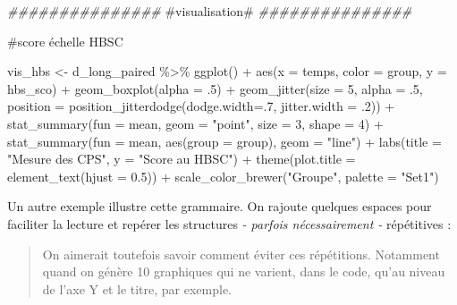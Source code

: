 \documentclass[
  letterpaper,
  DIV=11,
  numbers=noendperiod]{scrreprt}
\newenvironment{Shaded}{\begin{snugshade}}{\end{snugshade}}
\newcommand{\AttributeTok}[1]{\textcolor[rgb]{0.40,0.45,0.13}{#1}}
\newcommand{\CommentTok}[1]{\textcolor[rgb]{0.37,0.37,0.37}{#1}}
\newcommand{\DecValTok}[1]{\textcolor[rgb]{0.68,0.00,0.00}{#1}}
\newcommand{\DocumentationTok}[1]{\textcolor[rgb]{0.37,0.37,0.37}{\textit{#1}}}
\newcommand{\FloatTok}[1]{\textcolor[rgb]{0.68,0.00,0.00}{#1}}
\newcommand{\FunctionTok}[1]{\textcolor[rgb]{0.28,0.35,0.67}{#1}}
\newcommand{\NormalTok}[1]{\textcolor[rgb]{0.00,0.23,0.31}{#1}}
\newcommand{\OtherTok}[1]{\textcolor[rgb]{0.00,0.23,0.31}{#1}}
\newcommand{\SpecialCharTok}[1]{\textcolor[rgb]{0.37,0.37,0.37}{#1}}
\newcommand{\StringTok}[1]{\textcolor[rgb]{0.13,0.47,0.30}{#1}}
\begin{document}
\begin{Shaded}
\begin{Highlighting}[]
\DocumentationTok{\#\#\#\#\#\#\#\#\#\#\#\#\#\#\#}
\CommentTok{\#visualisation\#}
\DocumentationTok{\#\#\#\#\#\#\#\#\#\#\#\#\#\#\#}

\CommentTok{\#score échelle HBSC}

\NormalTok{vis\_hbs }\OtherTok{\textless{}{-}}\NormalTok{ d\_long\_paired }\SpecialCharTok{\%\textgreater{}\%} 
  \FunctionTok{ggplot}\NormalTok{() }\SpecialCharTok{+}
  \FunctionTok{aes}\NormalTok{(}\AttributeTok{x =}\NormalTok{ temps, }\AttributeTok{color =}\NormalTok{ group, }\AttributeTok{y =}\NormalTok{ hbs\_sco) }\SpecialCharTok{+}
  \FunctionTok{geom\_boxplot}\NormalTok{(}\AttributeTok{alpha =}\NormalTok{ .}\DecValTok{5}\NormalTok{) }\SpecialCharTok{+}
  \FunctionTok{geom\_jitter}\NormalTok{(}\AttributeTok{size =} \DecValTok{5}\NormalTok{, }\AttributeTok{alpha =}\NormalTok{ .}\DecValTok{5}\NormalTok{, }\AttributeTok{position =} \FunctionTok{position\_jitterdodge}\NormalTok{(}\AttributeTok{dodge.width=}\NormalTok{.}\DecValTok{7}\NormalTok{, }\AttributeTok{jitter.width =}\NormalTok{ .}\DecValTok{2}\NormalTok{)) }\SpecialCharTok{+}
  \FunctionTok{stat\_summary}\NormalTok{(}\AttributeTok{fun =}\NormalTok{ mean, }\AttributeTok{geom =} \StringTok{"point"}\NormalTok{, }\AttributeTok{size =} \DecValTok{3}\NormalTok{, }\AttributeTok{shape =} \DecValTok{4}\NormalTok{) }\SpecialCharTok{+}
  \FunctionTok{stat\_summary}\NormalTok{(}\AttributeTok{fun =}\NormalTok{ mean, }\FunctionTok{aes}\NormalTok{(}\AttributeTok{group =}\NormalTok{ group), }\AttributeTok{geom =} \StringTok{"line"}\NormalTok{) }\SpecialCharTok{+}
  \FunctionTok{labs}\NormalTok{(}\AttributeTok{title =} \StringTok{"Mesure des CPS"}\NormalTok{, }\AttributeTok{y =} \StringTok{"Score au HBSC"}\NormalTok{) }\SpecialCharTok{+}
  \FunctionTok{theme}\NormalTok{(}\AttributeTok{plot.title =} \FunctionTok{element\_text}\NormalTok{(}\AttributeTok{hjust =} \FloatTok{0.5}\NormalTok{)) }\SpecialCharTok{+}
  \FunctionTok{scale\_color\_brewer}\NormalTok{(}\StringTok{"Groupe"}\NormalTok{, }\AttributeTok{palette =} \StringTok{"Set1"}\NormalTok{)}
\end{Highlighting}
\end{Shaded}

Un autre exemple illustre cette grammaire. On rajoute quelques espaces
pour faciliter la lecture et repérer les structures \emph{- parfois
nécessairement -} répétitives :

\begin{quote}
On aimerait toutefois savoir comment éviter ces répétitions. Notamment
quand on génère 10 graphiques qui ne varient, dans le code, qu'au niveau
de l'axe Y et le titre, par exemple.
\end{quote}
\end{document}
